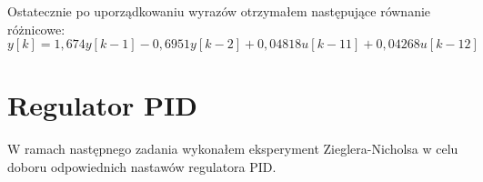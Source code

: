 \documentclass[a4paper,titlepage,11pt,floatssmall]{mwrep}
\begin{document}
Ostatecznie po uporządkowaniu wyrazów otrzymałem następujące równanie różnicowe:
\begin{equation*}
y[k] = 1,674y[k-1] - 0,6951y[k-2] + 0,04818u[k-11] + 0,04268u[k-12]  
\end{equation*}

\newpage

\section{Regulator PID}
W ramach następnego zadania wykonałem eksperyment Zieglera-Nicholsa w celu doboru odpowiednich nastawów regulatora PID.





  
\end{document}
